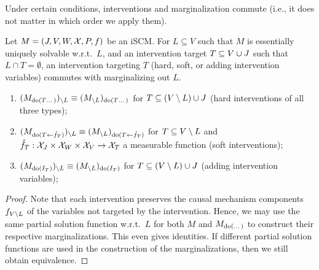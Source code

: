 Under certain conditions, interventions and marginalization commute (i.e., it does not matter in which order we apply them).
\begin{Prp}\label{prp:interventions_marginalizations_commute}
Let $M = \left ( J, V, W, \mathcal{X}, P, f \right )$ be an iSCM.
    For $L \subseteq V$ such that $M$ is essentially uniquely solvable w.r.t.\ $L$, and an intervention target $T \subseteq V \cup J$ such that $L \cap T = \emptyset$, an intervention targeting $T$ (hard, soft, or adding intervention variables) commutes with marginalizing out $L$.
    \begin{enumerate}
      \item $(M_{\operatorname{do}(T\dots)})_{\setminus L} \equiv (M_{\setminus L})_{\operatorname{do}(T\dots)}$ for $T \subseteq (V \setminus L) \cup J$ (hard interventions of all three types);
      \item $(M_{\operatorname{do}(T\mathrel{\leftarrow}\hat{f}_T)})_{\setminus L} \equiv (M_{\setminus L})_{\operatorname{do}(T\mathrel{\leftarrow}\hat{f}_T)}$ for $T \subseteq V \setminus L$ and $\hat f_T : \mathcal{X}_J \times \mathcal{X}_W \times \mathcal{X}_V \to \mathcal{X}_T$ a measurable function
        (soft interventions); 
      \item $(M_{\operatorname{do}(I_T)})_{\setminus L} \equiv (M_{\setminus L})_{\operatorname{do}(I_T)}$ for $T \subseteq (V \setminus L) \cup J$ (adding intervention variables);
    \end{enumerate}
\end{Prp}
\begin{proof}
  Note that each intervention preserves the causal mechanism components $f_{V\setminus L}$ of the variables not targeted by the intervention. 
  Hence, we may use the same partial solution function w.r.t.\ $L$ for both $M$ and $M_{\operatorname{do}(\dots)}$ to construct their respective marginalizations.
  This even gives identities.
  If different partial solution functions are used in the construction of the marginalizations, then we still obtain equivalence.
\end{proof}

